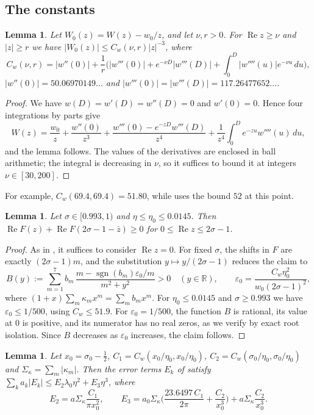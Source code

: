 \documentclass[11pt]{amsart}
\numberwithin{equation}{section}
\newtheorem{lemma}[theorem]{Lemma}
\theoremstyle{definition}
\theoremstyle{remark}
\newcommand{\Rp}{\operatorname{Re}}
\newcommand{\eps}{\varepsilon}
\DeclareMathOperator{\sgn}{sgn}
\begin{document}
\subsection{The constants}

\begin{lemma}\label{lem:W0}
Let $W_0(z) = W(z) - w_0/z$, and let $\nu, r > 0$.
For $\Rp z \geq \nu$ and $|z| \geq r$ we have $|W_0(z)| \leq C_w(\nu, r)|z|^{-3}$, where
\[
C_w(\nu, r) = |w''(0)| + \frac1r\Big(|w'''(0)| + e^{-\nu D}|w'''(D)| + \int_0^D|w''''(u)|e^{-\nu u}\,du\Big),
\]
$|w''(0)| = 50.06970149\ldots$ and $|w'''(0)| = |w'''(D)| = 117.26477652\ldots$.
\end{lemma}

\begin{proof}
We have $w(D) = w'(D) = w''(D) = 0$ and $w'(0) = 0$.
Hence four integrations by parts give
\[
W(z) = \frac{w_0}z + \frac{w''(0)}{z^3} + \frac{w'''(0) - e^{-zD}w'''(D)}{z^4} + \frac1{z^4}\int_0^De^{-zu}w''''(u)\,du,
\]
and the lemma follows.
The values of the derivatives are enclosed in ball arithmetic; the integral is decreasing in $\nu$, so it suffices to bound it at integers $\nu \in [30, 200]$.
\end{proof}

For example, $C_w(69.4, 69.4) = 51.80$, while \cite[Lemma~4]{BTY} uses the bound $52$ at this point.

\begin{lemma}\label{lem:L5}
Let $\sigma \in [0.993, 1)$ and $\eta \leq \eta_0 \leq 0.0145$.
Then $\Rp F(z) + \Rp F(2\sigma - 1 - \bar z) \geq 0$ for $0 \leq \Rp z \leq 2\sigma - 1$.
\end{lemma}

\begin{proof}
As in \cite[Lemma~5]{BTY}, it suffices to consider $\Rp z = 0$.
For fixed $\sigma$, the shifts in $F$ are exactly $(2\sigma-1)m$, and the substitution $y \mapsto y/(2\sigma - 1)$ reduces the claim to
\[
B(y) := \sum_{m=1}^7b_m\,\frac{m - \sgn(b_m)\eps_0/m}{m^2 + y^2} > 0 \quad (y \in \mathbb R), \qquad \eps_0 = \frac{C_w\eta_0^2}{w_0(2\sigma-1)^2},
\]
where $(1+x)\sum_m\kappa_mx^m = \sum_mb_mx^m$.
For $\eta_0 \leq 0.0145$ and $\sigma \geq 0.993$ we have $\eps_0 \leq 1/500$, using $C_w \leq 51.9$.
For $\eps_0 = 1/500$, the function $B$ is rational, its value at $0$ is positive, and its numerator has no real zeros, as we verify by exact root isolation.
Since $B$ decreases as $\eps_0$ increases, the claim follows.
\end{proof}

\begin{lemma}\label{lem:L89}
Let $x_0 = \sigma_0 - \frac12$, $C_1 = C_w(x_0/\eta_0, x_0/\eta_0)$, $C_2 = C_w(\sigma_0/\eta_0, \sigma_0/\eta_0)$ and $\Sigma_\kappa = \sum_m|\kappa_m|$.
Then the error terms $E_k$ of \cite[Lemma~8]{BTY} satisfy $\sum_ka_k|E_k| \leq E_2\lambda_0\eta^2 + E_3\eta^3$, where
\[
E_2 = a\Sigma_\kappa\frac{C_1}{\pi x_0^2}, \qquad E_3 = a_0\Sigma_\kappa\Big(\frac{23.6497\,C_1}{2\pi} + \frac{C_2}{x_0^3}\Big) + a\Sigma_\kappa\frac{C_2}{x_0^3}.
\]
\end{lemma}
\end{document}

